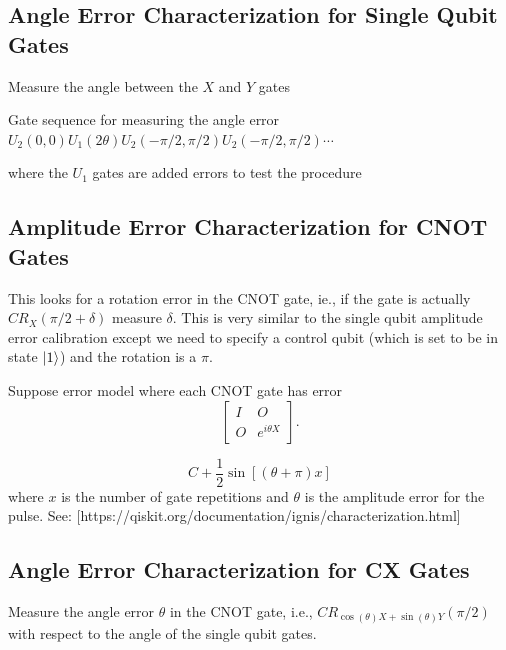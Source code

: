 \documentclass[11pt, oneside]{article}   	%
\begin{document}
\subsection{Angle Error Characterization for Single Qubit Gates}
Measure the angle between the $X$ and $Y$ gates

Gate sequence for measuring the angle error
$U_2(0, 0) U_1 (2 \theta) U_2(- \pi/2, \pi/2) U_2(- \pi/2, \pi/2) \cdots$

where the $U_1$ gates are added errors to test the procedure

\subsection{Amplitude Error Characterization for CNOT Gates}
This looks for a rotation error in the CNOT gate, ie., if the gate is actually $CR_X(\pi/2+\delta)$ measure $\delta$. 
This is very similar to the single qubit amplitude error calibration except we need to specify a control qubit (which is set to be in state $\ket{1}$) and the rotation is a $\pi$.

Suppose error model where each CNOT gate has error
\begin{equation}
\begin{bmatrix}
I & O \\
O & e^{i \theta X}
\end{bmatrix}.
\end{equation}

\begin{equation}
C + \frac{1}{2} \sin \left[ \left( \theta + \pi\right) x \right]
\end{equation}
where $x$ is the number of gate repetitions and $\theta$ is the amplitude error for the pulse.
See: [https://qiskit.org/documentation/ignis/characterization.html]

\subsection{Angle Error Characterization for CX Gates}
Measure the angle error $\theta$ in the CNOT gate, i.e., $CR_{\cos(\theta)X+\sin(\theta)Y}(\pi/2)$ with respect to the angle of the single qubit gates.
\end{document}
